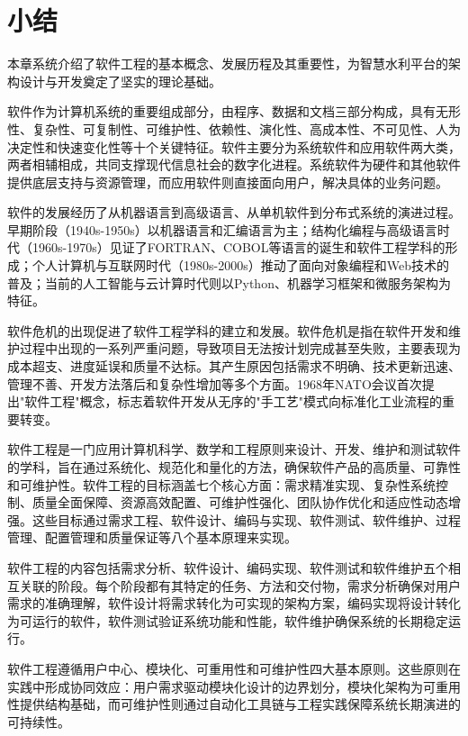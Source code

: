 \section{小结}

本章系统介绍了软件工程的基本概念、发展历程及其重要性，为智慧水利平台的架构设计与开发奠定了坚实的理论基础。

软件作为计算机系统的重要组成部分，由程序、数据和文档三部分构成，具有无形性、复杂性、可复制性、可维护性、依赖性、演化性、高成本性、不可见性、人为决定性和快速变化性等十个关键特征。软件主要分为系统软件和应用软件两大类，两者相辅相成，共同支撑现代信息社会的数字化进程。系统软件为硬件和其他软件提供底层支持与资源管理，而应用软件则直接面向用户，解决具体的业务问题。

软件的发展经历了从机器语言到高级语言、从单机软件到分布式系统的演进过程。早期阶段（1940s-1950s）以机器语言和汇编语言为主；结构化编程与高级语言时代（1960s-1970s）见证了FORTRAN、COBOL等语言的诞生和软件工程学科的形成；个人计算机与互联网时代（1980s-2000s）推动了面向对象编程和Web技术的普及；当前的人工智能与云计算时代则以Python、机器学习框架和微服务架构为特征。

软件危机的出现促进了软件工程学科的建立和发展。软件危机是指在软件开发和维护过程中出现的一系列严重问题，导致项目无法按计划完成甚至失败，主要表现为成本超支、进度延误和质量不达标。其产生原因包括需求不明确、技术更新迅速、管理不善、开发方法落后和复杂性增加等多个方面。1968年NATO会议首次提出"软件工程"概念，标志着软件开发从无序的"手工艺"模式向标准化工业流程的重要转变。

软件工程是一门应用计算机科学、数学和工程原则来设计、开发、维护和测试软件的学科，旨在通过系统化、规范化和量化的方法，确保软件产品的高质量、可靠性和可维护性。软件工程的目标涵盖七个核心方面：需求精准实现、复杂性系统控制、质量全面保障、资源高效配置、可维护性强化、团队协作优化和适应性动态增强。这些目标通过需求工程、软件设计、编码与实现、软件测试、软件维护、过程管理、配置管理和质量保证等八个基本原理来实现。

软件工程的内容包括需求分析、软件设计、编码实现、软件测试和软件维护五个相互关联的阶段。每个阶段都有其特定的任务、方法和交付物，需求分析确保对用户需求的准确理解，软件设计将需求转化为可实现的架构方案，编码实现将设计转化为可运行的软件，软件测试验证系统功能和性能，软件维护确保系统的长期稳定运行。

软件工程遵循用户中心、模块化、可重用性和可维护性四大基本原则。这些原则在实践中形成协同效应：用户需求驱动模块化设计的边界划分，模块化架构为可重用性提供结构基础，而可维护性则通过自动化工具链与工程实践保障系统长期演进的可持续性。

